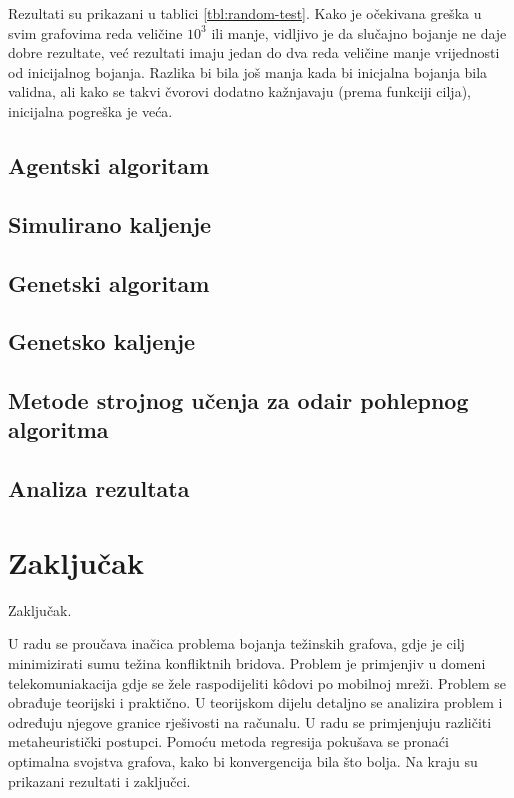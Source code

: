 \documentclass[times, utf8, diplomski, numeric]{fer}
\begin{document}
Rezultati su prikazani u tablici \ref{tbl:random-test}.
Kako je očekivana greška u svim grafovima reda veličine $10^3$ ili manje, vidljivo je da slučajno bojanje ne daje dobre rezultate, već rezultati imaju jedan do dva reda veličine manje vrijednosti od inicijalnog bojanja. Razlika bi bila još manja kada bi inicjalna bojanja bila validna, ali kako se takvi čvorovi dodatno kažnjavaju (prema funkciji cilja), inicijalna pogreška je veća.

\section{Agentski algoritam}

\section{Simulirano kaljenje}

\section{Genetski algoritam}

\section{Genetsko kaljenje}

\section{Metode strojnog učenja za odair pohlepnog algoritma}

\section{Analiza rezultata}

\chapter{Zaključak}
Zaključak.




\begin{sazetak}

U radu se proučava inačica problema bojanja težinskih grafova, gdje je cilj minimizirati sumu težina konfliktnih bridova. Problem je primjenjiv u domeni telekomuniakacija gdje se žele raspodijeliti k\^{o}dovi po mobilnoj mreži. Problem se obrađuje teorijski i praktično. U teorijskom dijelu detaljno se analizira problem i određuju njegove granice rješivosti na računalu. U radu se primjenjuju različiti metaheuristički postupci. Pomoću metoda regresija pokušava se pronaći optimalna svojstva grafova, kako bi konvergencija bila što bolja. Na kraju su prikazani rezultati i zaključci.

\end{sazetak}
\end{document}

